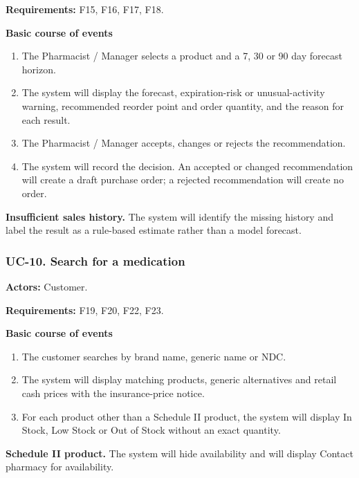 \textbf{Requirements:} F15, F16, F17, F18.

\textbf{Basic course of events}
\begin{enumerate}
\item The Pharmacist / Manager selects a product and a 7, 30 or 90 day forecast horizon.
\item The system will display the forecast, expiration-risk or unusual-activity warning, recommended reorder point and order quantity, and the reason for each result.
\item The Pharmacist / Manager accepts, changes or rejects the recommendation.
\item The system will record the decision. An accepted or changed recommendation will create a draft purchase order; a rejected recommendation will create no order.
\end{enumerate}

\textbf{Insufficient sales history.} The system will identify the missing history and label the result as a rule-based estimate rather than a model forecast.


\clearpage
\subsubsection*{UC-10. Search for a medication}
\textbf{Actors:} Customer.

\textbf{Requirements:} F19, F20, F22, F23.

\textbf{Basic course of events}
\begin{enumerate}
\item The customer searches by brand name, generic name or NDC.
\item The system will display matching products, generic alternatives and retail cash prices with the insurance-price notice.
\item For each product other than a Schedule II product, the system will display In Stock, Low Stock or Out of Stock without an exact quantity.
\end{enumerate}

\textbf{Schedule II product.} The system will hide availability and will display Contact pharmacy for availability.

